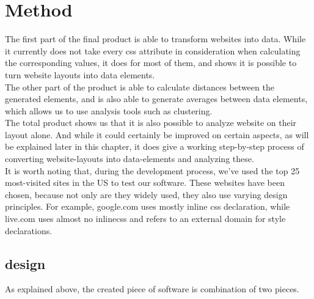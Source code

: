 \chapter{Method}\label{method}
The first part of the final product is able to transform websites into data. While it currently does not take every css attribute in consideration when calculating the corresponding values, it does for most of them, and shows it is possible to turn website layouts into data elements.\\
The other part of the product is able to calculate distances between the generated elements, and is also able to generate averages between data elements, which allows us to use analysis tools such as clustering.\\
The total product shows us that it is also possible to analyze website on their layout alone. And while it could certainly be improved on certain aspects, as will be explained later in this chapter, it does give a working step-by-step process of converting website-layouts into data-elements and analyzing these.\\
It is worth noting that, during the development process, we've used the top 25 most-visited sites in the US to test our software. These websites have been chosen, because not only are they widely used, they also use varying design principles. For example, google.com uses mostly inline css declaration, while live.com uses almost no inline\-css and refers to an external domain for style declarations.
\section{design}
As explained above, the created piece of software is combination of two pieces.

